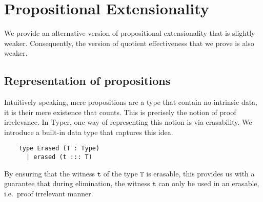 \documentclass[12pt,twoside,maitrise]{dms}
\theoremstyle{definition}
\numberwithin{equation}{section}
\numberwithin{table}{chapter}
\numberwithin{figure}{chapter}
\newcommand\id[1] {\texttt{#1}}
\begin{document}
\section{Propositional Extensionality}
We provide an alternative version of propositional extensionality that is
slightly weaker. Consequently, the version of quotient effectiveness that we
prove is also weaker.

\subsection*{Representation of propositions}\label{subsec:mere-propositions}

Intuitively speaking, mere propositions are a type that contain no intrinsic
data, it is their mere existence that counts. This is precisely the notion of
proof irrelevance. In Typer, one way of representing this notion is via
erasability. We introduce a built-in data type that captures this idea.

\begin{verbatim}
    type Erased (T : Type)
      | erased (t ::: T)
\end{verbatim}

By ensuring that the witness $\id{t}$ of the type $\id{T}$ is erasable, this
provides us with a guarantee that during elimination, the witness $\id{t}$ can
only be used in an erasable, i.e.\ proof irrelevant manner.





\end{document}
